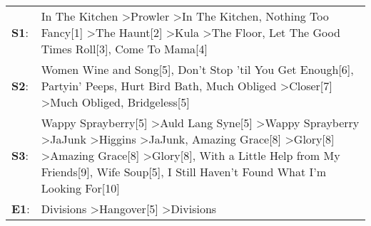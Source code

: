 \begin{supertabular}{p{0.03\textwidth}p{0.92\textwidth}}
 \textbf{S1}:  &                                                                                                                                                                                                                                                       In The Kitchen\textsuperscript{} \textgreater \enspace Prowler\textsuperscript{} \textgreater \enspace In The Kitchen\textsuperscript{}, \enspace Nothing Too Fancy[1]\textsuperscript{} \textgreater \enspace The Haunt[2]\textsuperscript{} \textgreater \enspace Kula\textsuperscript{} \textgreater \enspace The Floor\textsuperscript{}, \enspace Let The Good Times Roll[3]\textsuperscript{}, \enspace Come To Mama[4]\textsuperscript{}  \enspace  \\
 \textbf{S2}:  &                                                                                                                                                                                                                                                                                                                Women Wine and Song[5]\textsuperscript{}, \enspace Don't Stop 'til You Get Enough[6]\textsuperscript{}, \enspace Partyin' Peeps\textsuperscript{}, \enspace Hurt Bird Bath\textsuperscript{}, \enspace Much Obliged\textsuperscript{} \textgreater \enspace Closer[7]\textsuperscript{} \textgreater \enspace Much Obliged\textsuperscript{}, \enspace Bridgeless[5]\textsuperscript{}  \enspace  \\
 \textbf{S3}:  &  Wappy Sprayberry[5]\textsuperscript{} \textgreater \enspace Auld Lang Syne[5]\textsuperscript{} \textgreater \enspace Wappy Sprayberry\textsuperscript{} \textgreater \enspace JaJunk\textsuperscript{} \textgreater \enspace Higgins\textsuperscript{} \textgreater \enspace JaJunk\textsuperscript{}, \enspace Amazing Grace[8]\textsuperscript{} \textgreater \enspace Glory[8]\textsuperscript{} \textgreater \enspace Amazing Grace[8]\textsuperscript{} \textgreater \enspace Glory[8]\textsuperscript{}, \enspace With a Little Help from My Friends[9]\textsuperscript{}, \enspace Wife Soup[5]\textsuperscript{}, \enspace I Still Haven't Found What I'm Looking For[10]\textsuperscript{}  \enspace  \\
 \textbf{E1}:  &                                                                                                                                                                                                                                                                                                                                                                                                                                                                                                                                                                     Divisions\textsuperscript{} \textgreater \enspace Hangover[5]\textsuperscript{} \textgreater \enspace Divisions\textsuperscript{}  \enspace  \\
\end{supertabular}
